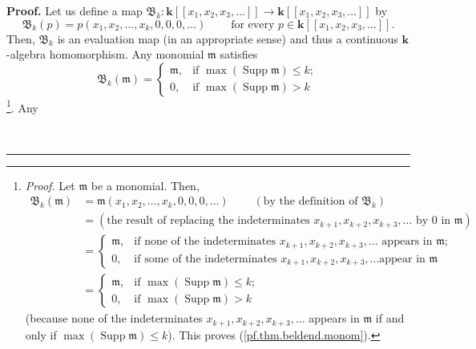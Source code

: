 \documentclass
[numbers=enddot,12pt,final,onecolumn,notitlepage,abstracton]{scrartcl}%
\theoremstyle{definition}
\newenvironment{proof}[1][Proof]{\noindent\textbf{#1.} }{\ \rule{0.5em}{0.5em}}
\newenvironment{verlong}{}{}
\begin{document}
\begin{proof}
\begin{verlong}
Let us define a map $\mathfrak{B}_{k}:\mathbf{k}\left[  \left[  x_{1}%
,x_{2},x_{3},\ldots\right]  \right]  \rightarrow\mathbf{k}\left[  \left[
x_{1},x_{2},x_{3},\ldots\right]  \right]  $ by%
\[
\mathfrak{B}_{k}\left(  p\right)  =p\left(  x_{1},x_{2},\ldots,x_{k}%
,0,0,0,\ldots\right)  \ \ \ \ \ \ \ \ \ \ \text{for every }p\in\mathbf{k}%
\left[  \left[  x_{1},x_{2},x_{3},\ldots\right]  \right]  .
\]
Then, $\mathfrak{B}_{k}$ is an evaluation map (in an appropriate sense) and
thus a continuous $\mathbf{k}$-algebra homomorphism. Any monomial
$\mathfrak{m}$ satisfies%
\begin{equation}
\mathfrak{B}_{k}\left(  \mathfrak{m}\right)  =%
\begin{cases}
\mathfrak{m}, & \text{if }\max\left(  \operatorname*{Supp}\mathfrak{m}\right)
\leq k;\\
0, & \text{if }\max\left(  \operatorname*{Supp}\mathfrak{m}\right)  >k
\end{cases}
\label{pf.thm.beldend.monom}%
\end{equation}
\footnote{\textit{Proof.} Let $\mathfrak{m}$ be a monomial. Then,%
\begin{align*}
\mathfrak{B}_{k}\left(  \mathfrak{m}\right)   &  =\mathfrak{m}\left(
x_{1},x_{2},\ldots,x_{k},0,0,0,\ldots\right)  \ \ \ \ \ \ \ \ \ \ \left(
\text{by the definition of }\mathfrak{B}_{k}\right) \\
&  =\left(  \text{the result of replacing the indeterminates }x_{k+1}%
,x_{k+2},x_{k+3},\ldots\text{ by }0\text{ in }\mathfrak{m}\right) \\
&  =%
\begin{cases}
\mathfrak{m}, & \text{if none of the indeterminates }x_{k+1},x_{k+2}%
,x_{k+3},\ldots\text{ appears in }\mathfrak{m}\text{;}\\
0, & \text{if some of the indeterminates }x_{k+1},x_{k+2},x_{k+3},\ldots\text{
appear in }\mathfrak{m}%
\end{cases}
\\
&  =%
\begin{cases}
\mathfrak{m}, & \text{if }\max\left(  \operatorname*{Supp}\mathfrak{m}\right)
\leq k;\\
0, & \text{if }\max\left(  \operatorname*{Supp}\mathfrak{m}\right)  >k
\end{cases}
\end{align*}
(because none of the indeterminates $x_{k+1},x_{k+2},x_{k+3},\ldots$ appears
in $\mathfrak{m}$ if and only if $\max\left(  \operatorname*{Supp}%
\mathfrak{m}\right)  \leq k$). This proves (\ref{pf.thm.beldend.monom}).}. Any

\end{verlong}
\end{proof}
\end{document}
